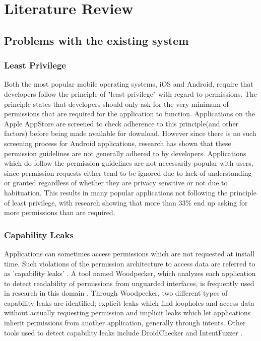 \chapter{Literature Review} \label{cha:litrev}
\section{Problems with the existing system}
\subsection{Least Privilege}
Both the most popular mobile operating systems, iOS and Android, require that developers follow the principle of "least privilege" with regard to permissions. The principle states that developers should only ask for the very minimum of permissions that are required for the application to function\cite{enck2009understanding}. Applications on the Apple AppStore are screened to check adherence to this principle(and other factors) before being made available for download\cite{gilbert2011vision}. However since there is no such screening process for Android applications, research has shown that these permission guidelines are not generally adhered to by developers\cite{stevens2013asking}. Applications which do follow the permission guidelines are not necessarily popular with users, since permission requests either tend to be ignored due to lack of understanding\cite{felt2011android} \cite{kelley2012conundrum} or granted regardless of whether they are privacy sensitive or not due to habituation\cite{felt2012android}. This results in many popular applications not following the principle of least privilege\cite{wei2012permission}, with research showing that more than 33\% end up asking for more permissions than are required\cite{felt2011android}.

\subsection{Capability Leaks}
Applications can sometimes access permissions which are not requested at install time. Such violations of the permission architecture to access data are referred to as 'capability leaks' \cite{grace2012systematic} \cite{grace2011detecting}. A tool named Woodpecker, which analyzes each application to detect readability of permissions from unguarded interfaces, is frequently used in research in this domain \cite{zhou2012hey}. Through Woodpecker, two different types of capability leaks are identified; explicit leaks which find loopholes and access data without actually requesting permission and implicit leaks which let applications inherit permissions from another application, generally through intents. Other tools used to detect capability leaks include DroidChecker and IntentFuzzer \cite{yang2014intentfuzzer} \cite{chan2012droidchecker}.

